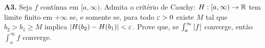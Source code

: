 \documentclass[11pt,a4paper]{article}
\begin{document}
\begin{exercicio}
\textbf{A3.} Seja \(f\) contínua em \([a,\infty)\). Admita o critério de Cauchy: \(H:[a,\infty)\to\mathbb{R}\) tem limite finito em \(+\infty\) se, e somente se, para todo \(\varepsilon>0\) existe \(M\) tal que \(b_{2}>b_{1}\ge M\) implica \(\left\lvert H(b_{2})-H(b_{1}) \right\rvert<\varepsilon\). Prove que, se \(\int_a^{\infty}\left\lvert f \right\rvert\) converge, então \(\int_a^{\infty} f\) converge.
\end{exercicio}
\end{document}
